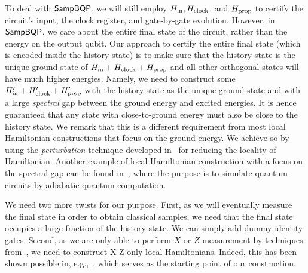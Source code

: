 To deal with $\operatorname{\mathsf{SampBQP}}$, we will still employ $H_{\mathrm{in}}, H_{\mathrm{clock}}$, and $H_{\mathrm{prop}}$ to certify the circuit's input, the clock register, and gate-by-gate evolution. However, in $\operatorname{\mathsf{SampBQP}}$, we care about the entire final state of the circuit, rather than the energy on the output qubit. 
Our approach to certify the entire final state (which is encoded inside the history state) is to make sure that the history state is the unique ground state of $H_{\mathrm{in}} + H_{\mathrm{clock}}+ H_{\mathrm{prop}}$ and all other orthogonal states will have much higher energies. 
Namely, we need to construct some $H_{\mathrm{in}}'+ H_{\mathrm{clock}}'+ H_{\mathrm{prop}}'$ with the history state as the unique ground state and with a large \emph{spectral} gap between the ground energy and excited energies. 
It is hence guaranteed that any state with close-to-ground energy must also be close to the history state. 
We remark that this is a different requirement from most local Hamiltonian constructions that focus on the ground energy. 
We achieve so by using the \emph{perturbation} technique developed in~\cite{kempe_kitaev_regev_2006} for reducing the locality of Hamiltonian. 
Another example of local Hamiltonian construction with a focus on the spectral gap can be found in~\cite{adiabatic}, where the purpose is to simulate quantum circuits by adiabatic quantum computation. 

We need two more twists for our purpose. 
First, as we will eventually measure the final state in order to obtain classical samples, we need that the final state occupies a large fraction of the history state. We can simply add dummy identity gates. 
Second, as we are only able to perform $X$ or $Z$ measurement by techniques from~\cite{FOCS:Mahadev18a},
we need to construct X-Z only local Hamiltonians. 
Indeed, this has been shown possible in, e.g.,~\cite{PhysRevA.78.012352}, which serves as the starting point of our construction. 



